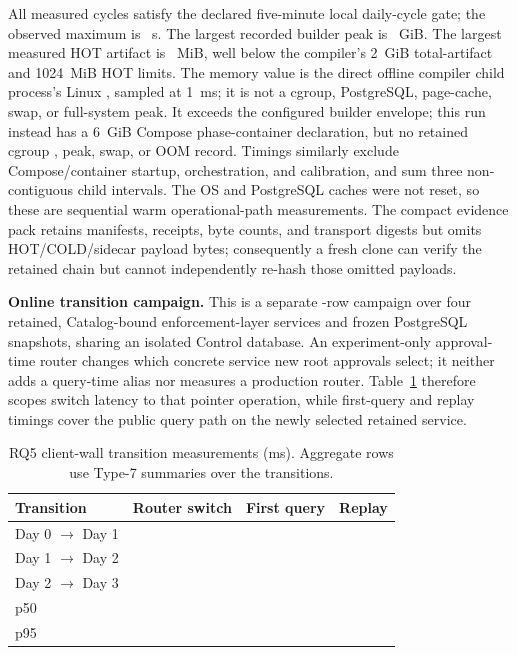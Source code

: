 \documentclass[journal,onecolumn]{IEEEtran}
\newcommand{\code}[1]{\texttt{\detokenize{#1}}}
\begin{document}
All \RQFiveTotalBuildRuns{} measured cycles satisfy the declared five-minute
local daily-cycle gate; the observed maximum is \RQFiveMaxCycleS{}~s. The
largest recorded builder peak is \RQFiveBuilderPeakGiB{}~GiB. The largest
measured HOT artifact is \RQFiveHotArtifactMiB{}~MiB, well below the
compiler's 2~GiB total-artifact and 1024~MiB HOT limits. The memory value is the direct
offline compiler child process's Linux \code{VmHWM}, sampled at 1~ms; it is not
a cgroup, PostgreSQL, page-cache, swap, or full-system peak. It exceeds the
configured builder envelope; this run instead has a 6~GiB Compose
phase-container declaration, but no retained cgroup \code{memory.max}, peak,
swap, or OOM record. Timings similarly
exclude Compose/container startup, orchestration, and calibration, and sum
three non-contiguous child intervals. The OS and PostgreSQL caches were not
reset, so these are sequential warm operational-path measurements. The compact
evidence pack retains manifests, receipts, byte counts, and transport digests
but omits HOT/COLD/sidecar payload bytes; consequently a fresh clone can verify
the retained chain but cannot independently re-hash those omitted payloads.

\textbf{Online transition campaign.}
This is a separate \RQFiveRows-row campaign over four retained,
Catalog-bound enforcement-layer services and frozen PostgreSQL snapshots, sharing an
isolated Control database. An experiment-only approval-time router changes
which concrete service new root approvals select; it neither adds a query-time
\code{latest} alias nor measures a production router. Table~\ref{tab:rq5-online-supp}
therefore scopes switch latency to that pointer operation, while first-query
and replay timings cover the public query path on the newly selected retained
service.

\begin{table}[t]
\centering
\caption{RQ5 client-wall transition measurements (ms). Aggregate rows use
Type-7 summaries over the \RQFiveTransitions{} transitions.}
\label{tab:rq5-online-supp}
\small
\begin{tabular}{lrrr}
\toprule
Transition & Router switch & First query & Replay \\
\midrule
Day 0 $\rightarrow$ Day 1 & \RQFiveDayZeroToOneSwitchMS{} &
  \RQFiveDayZeroToOneFirstQueryMS{} & \RQFiveDayZeroToOneReplayMS{} \\
Day 1 $\rightarrow$ Day 2 & \RQFiveDayOneToTwoSwitchMS{} &
  \RQFiveDayOneToTwoFirstQueryMS{} & \RQFiveDayOneToTwoReplayMS{} \\
Day 2 $\rightarrow$ Day 3 & \RQFiveDayTwoToThreeSwitchMS{} &
  \RQFiveDayTwoToThreeFirstQueryMS{} & \RQFiveDayTwoToThreeReplayMS{} \\
\midrule
p50 & \RQFiveSwitchMedianMS{} & \RQFiveFirstQueryMedianMS{} &
  \RQFiveReplayMedianMS{} \\
p95 & \RQFiveSwitchTailMS{} & \RQFiveFirstQueryTailMS{} &
  \RQFiveReplayTailMS{} \\
\bottomrule
\end{tabular}
\end{table}
\end{document}

